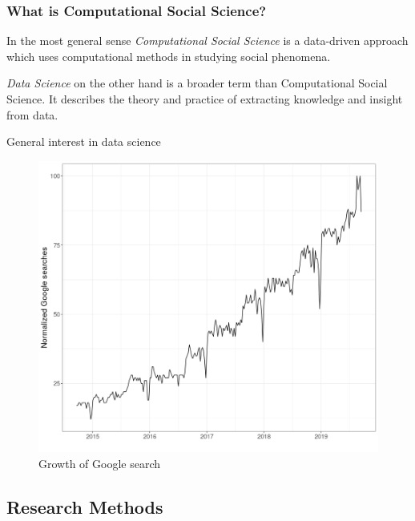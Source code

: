 \begin{frame}
    \frametitle{What is Computational Social Science?}
    \begin{definition}{}
        In the most general sense \emph{Computational Social Science} is a data-driven approach which uses computational methods in studying social phenomena.
    \end{definition}
    \begin{definition}{}
        \emph{Data Science} on the other hand is a broader term than Computational Social Science. It describes the theory and practice of extracting knowledge and insight from data.
    \end{definition}
\end{frame}

\begin{frame}{General interest in data science}
    \begin{figure}
    \caption{Growth of Google search}
    \includegraphics[width = .8\framewidth]{png/ds-searches.png}

    \end{figure}
\end{frame}

\subsection{Research Methods}

